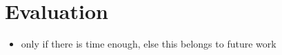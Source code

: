 \section{Evaluation}

\begin{itemize}
\item only if there is time enough, else this belongs to future work
\end{itemize}
